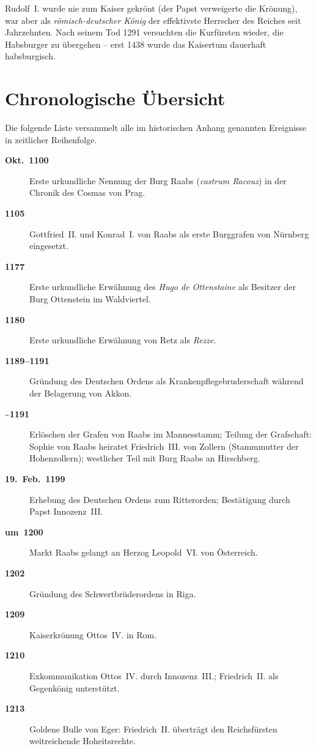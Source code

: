 Rudolf~I. wurde nie zum Kaiser gekrönt (der Papst verweigerte die Krönung), war aber als \textit{römisch-deutscher König} der effektivste Herrscher des Reiches seit Jahrzehnten. Nach seinem Tod 1291 versuchten die Kurfürsten wieder, die Habsburger zu übergehen -- erst 1438 wurde das Kaisertum dauerhaft habsburgisch. \cite{niederstaetter_oesterreich}

\section{Chronologische Übersicht}

Die folgende Liste versammelt alle im historischen Anhang genannten Ereignisse in zeitlicher Reihenfolge.

\begin{description}
  \item[\textbf{Okt.~1100}] Erste urkundliche Nennung der Burg Raabs (\textit{castrum Racouz}) in der Chronik des Cosmas von Prag.
  \item[\textbf{1105}] Gottfried~II. und Konrad~I. von Raabs als erste Burggrafen von Nürnberg eingesetzt.
  \item[\textbf{1177}] Erste urkundliche Erwähnung des \textit{Hugo de Ottenstaine} als Besitzer der Burg Ottenstein im Waldviertel.
  \item[\textbf{1180}] Erste urkundliche Erwähnung von Retz als \textit{Rezze}.
  \item[\textbf{1189--1191}] Gründung des Deutschen Ordens als Krankenpflegebruderschaft während der Belagerung von Akkon.
  \item[\textbf{\textasciitilde{}1191}] Erlöschen der Grafen von Raabs im Mannesstamm; Teilung der Grafschaft: Sophie von Raabs heiratet Friedrich~III. von Zollern (Stammmutter der Hohenzollern); westlicher Teil mit Burg Raabs an Hirschberg.
  \item[\textbf{19.~Feb.~1199}] Erhebung des Deutschen Ordens zum Ritterorden; Bestätigung durch Papst Innozenz~III.
  \item[\textbf{um~1200}] Markt Raabs gelangt an Herzog Leopold~VI. von Österreich.
  \item[\textbf{1202}] Gründung des Schwertbrüderordens in Riga.
  \item[\textbf{1209}] Kaiserkrönung Ottos~IV. in Rom.
  \item[\textbf{1210}] Exkommunikation Ottos~IV. durch Innozenz~III.; Friedrich~II. als Gegenkönig unterstützt.
  \item[\textbf{1213}] Goldene Bulle von Eger: Friedrich~II. überträgt den Reichsfürsten weitreichende Hoheitsrechte.

\end{description}
